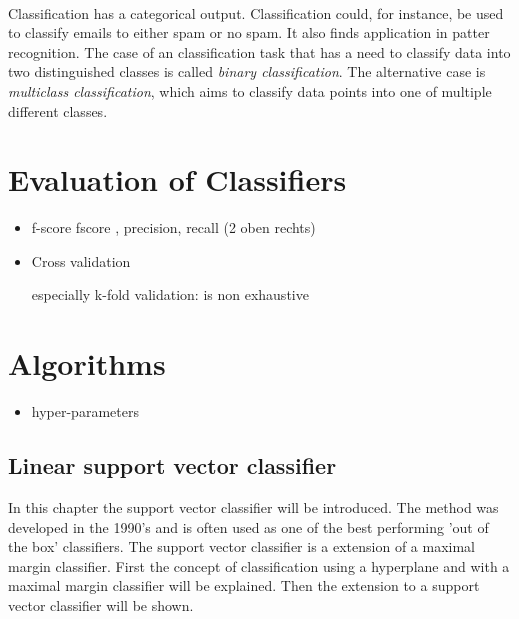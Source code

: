 \\
Classification has a categorical output. Classification could, for instance, be used to classify emails to either spam or no spam. It also finds application in patter recognition. %
The case of an classification task that has a need to classify data into two distinguished classes is called \emph{binary classification}. The alternative case is \emph{multiclass classification}, which aims to classify data points into one of multiple different classes.


\section{Evaluation of Classifiers}
\begin{itemize}
\item{f-score}
fscore , precision, recall
(2 oben rechts)
\item{Cross validation}

especially k-fold validation: 
is non exhaustive


\end{itemize}
\section{Algorithms}
\begin{itemize}
\item{hyper-parameters}
\end{itemize}
\subsection{Linear support vector classifier}
In this chapter the support vector classifier will be introduced. The method was developed in the 1990’s and is often used as one of the best performing 'out of the box' classifiers. The support vector classifier is a extension of a maximal margin classifier. First  the concept of classification using a hyperplane and with a maximal margin classifier will be explained. Then the extension to a support vector classifier will be shown.

